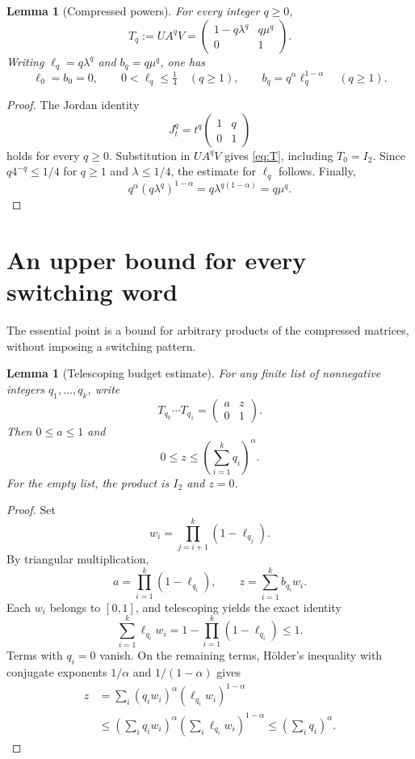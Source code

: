 \documentclass[11pt]{article}
\newtheorem{lemma}[theorem]{Lemma}
\theoremstyle{remark}\newtheorem{remark}[theorem]{Remark}
\begin{document}
\begin{lemma}[Compressed powers]\label{lem:compressed}
For every integer $q\geq0$,
\begin{equation}\label{eq:T}
 T_q:=UA^qV=\begin{pmatrix}1-q\lambda^q&q\mu^q\\0&1\end{pmatrix}.
\end{equation}
Writing $\ell_q=q\lambda^q$ and $b_q=q\mu^q$, one has
\[
 \ell_0=b_0=0,\qquad 0<\ell_q\leq\tfrac14\quad(q\geq1),
 \qquad b_q=q^\alpha\ell_q^{1-\alpha}\quad(q\geq1).
\]
\end{lemma}
\begin{proof}
The Jordan identity
\[
 J_t^q=t^q\begin{pmatrix}1&q\\0&1\end{pmatrix}
\]
holds for every $q\geq0$. Substitution in $UA^qV$ gives \eqref{eq:T}, including $T_0=I_2$. Since $q4^{-q}\leq1/4$ for $q\geq1$ and $\lambda\leq1/4$, the estimate for $\ell_q$ follows. Finally,
\[
 q^\alpha(q\lambda^q)^{1-\alpha}
 =q\lambda^{q(1-\alpha)}=q\mu^q.
\]
\end{proof}

\section{An upper bound for every switching word}
The essential point is a bound for arbitrary products of the compressed matrices, without imposing a switching pattern.

\begin{lemma}[Telescoping budget estimate]\label{lem:budget}
For any finite list of nonnegative integers $q_1,\ldots,q_k$, write
\[
 T_{q_k}\cdots T_{q_1}=\begin{pmatrix}a&z\\0&1\end{pmatrix}.
\]
Then $0\leq a\leq1$ and
\[
 0\leq z\leq\left(\sum_{i=1}^k q_i\right)^\alpha.
\]
For the empty list, the product is $I_2$ and $z=0$.
\end{lemma}
\begin{proof}
Set
\[
 w_i=\prod_{j=i+1}^k(1-\ell_{q_j}).
\]
By triangular multiplication,
\[
 a=\prod_{i=1}^k(1-\ell_{q_i}),\qquad
 z=\sum_{i=1}^k b_{q_i}w_i.
\]
Each $w_i$ belongs to $[0,1]$, and telescoping yields the exact identity
\begin{equation}\label{eq:telescoping}
 \sum_{i=1}^k\ell_{q_i}w_i
 =1-\prod_{i=1}^k(1-\ell_{q_i})\leq1.
\end{equation}
Terms with $q_i=0$ vanish. On the remaining terms, H\"older's inequality with conjugate exponents $1/\alpha$ and $1/(1-\alpha)$ gives
\begin{align*}
 z&=\sum_i(q_iw_i)^\alpha(\ell_{q_i}w_i)^{1-\alpha}\\
  &\leq\left(\sum_iq_iw_i\right)^\alpha
        \left(\sum_i\ell_{q_i}w_i\right)^{1-\alpha}
   \leq\left(\sum_iq_i\right)^\alpha.
\end{align*}
\end{proof}
\end{document}
